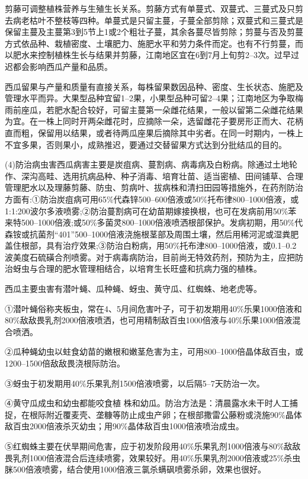 \documentclass{ctexbook}
\begin{document}
剪藤可调整植株营养与生殖生长关系。剪藤方式有单蔓式、双蔓式、三蔓式及只剪去病老枯叶不整枝等四种。单蔓式是只留主蔓，子蔓全部剪除；双蔓式和三蔓式是保留主蔓及主蔓第3到5节上1或2个粗壮子蔓，其余各蔓尽皆剪除；剪蔓与否及剪蔓方式依品种、栽植密度、土壤肥力、施肥水平和劳力条件而定。也有不行剪蔓，而以肥水来控制植株生长与结果并剪藤，江南地区宜在6到7月上旬剪2--3次。过早过迟都会影响西瓜产量和品质。

西瓜留果与产量和质量有直接关系，每株留果数因品种、密度、生长状态、施肥及管理水平而异。大果型品种宜留1--2果，小果型品种可留2--4果；江南地区为争取梅雨前座瓜，若肥水配合较好，可留主蔓第一朵雌花结果，一般以留第二朵雌花结果为宜。在一株上同时开两朵雌花时，应摘除一朵，选留雌花子要房形正而大、花柄直而粗，保留用以结果，或者待两瓜座果后摘除其中劣者。在同一时期内，一株上不宜多果，否则果小，成熟推迟，要通过交替留果方式达到分批结瓜的目的。

(4)防治病虫害西瓜病害主要是炭疽病、蔓割病、病毒病及白粉病。除通过土地轮作、深沟高畦、选用抗病品种、种子消毒、培育壮苗、适当密植、田间铺草、合理管理肥水以及理藤剪藤、防虫、剪病叶、拔病株和清扫田园等措施外，在药剂防治方面有:①防治炭疽病可用65\%代森锌500--600倍液或50\%托布律800--1000倍液，或1:1:200波尔多液喷雾;②防治蔓割病可在幼苗期嫁接换根，也可在发病前用50\%苯来特500--1000倍液;或50\%多菌灵800--1000倍液喷洒根部保护。发病初期，用50\%代森铵或抗菌剂“401”500--1000倍液浇施根茎部及周围土壤，然后用稀河泥或湿粪肥盖住根部，具有治疗效果;③防治白粉病，用50\%托布津800--1000倍液，或0.1--0.2波美度石硫磺合剂喷雾。对于病毒病防治，目前尚无特效药剂，预防为主，应把防治蚜虫与合理的肥水管理相结合，以培育生长旺盛和抗病力强的植株。

西瓜主要虫害有潜叶蝇、瓜种蝇、蚜虫、黄守瓜、红蜘蛛、地老虎等。

①潜叶蝇俗称夹板虫，常在4、5月间危害叶子，可于初发期用40\%乐果1000倍液和80\%敌敌畏乳剂2000倍液喷洒，也可用精制敌百虫1000倍液与40\%乐果1000倍液混合喷洒。

②瓜种蝇幼虫以蛀食幼苗的嫩根和嫩茎危害为主，可用800--1000倍晶体敌百虫，或1200--1500倍敌敌畏浇根际防治。

③蚜虫于初发期用40\%乐果乳剂1500倍液喷雾，以后隔5--7天防治一次。

④黄守瓜成虫和幼虫都能咬食植
株和幼瓜。防治方法是：清晨露水未干时人工捕捉，在根际附近覆麦壳、垄糠等防止成虫产卵；在根部撒雷公藤粉或浇施90\%晶体敌百虫2000倍液杀灭幼虫；用90\%晶体敌百虫1000倍液喷治成虫。

⑤红蜘蛛主要在伏旱期间危害，应于初发阶段用40\%乐果乳剂1000倍液与80\%敌敌畏乳剂1000倍液混合后连续喷雾，效果较好。用40\%乐果乳剂2000倍液或25\%杀虫脒500倍液喷雾，结合使用1000倍液三氯杀螨砜喷雾杀卵，效果也很好。
\end{document}
